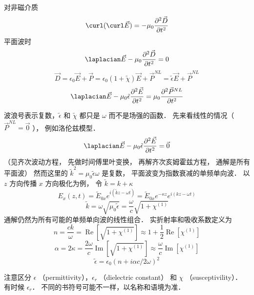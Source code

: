 
对非磁介质
\begin{equation}
  \curl (\curl \vec E) =  - {\mu _0}\frac{{{\partial ^2}\vec D}}{{\partial {t^2}}}
 \end{equation}
平面波时
 \begin{equation}
  {\laplacian}\vec E - {\mu _0}\frac{{{\partial ^2}\vec D}}{{\partial {t^2}}} = 0
 \end{equation}
 \begin{equation}
\vec D = {\epsilon _0}\vec E + \vec P = {\epsilon _0}(1 + \tilde \chi )\vec E + {\vec P^{NL}} = \tilde \epsilon \vec E + {\vec P^{NL}}
 \end{equation}
 \begin{equation}
{\laplacian}\vec E - {\mu _0}\tilde \epsilon \frac{{{\partial ^2}\vec E}}{{\partial {t^2}}} = {\mu _0}\frac{{{\partial ^2}{{\vec P}^{NL}}}}{{\partial {t^2}}}
 \end{equation}
 
波浪号表示复数，$\tilde \epsilon$ 和 $\tilde \chi $ 都只是 $\omega $ 而不是场强的函数． 先来看线性的情况（ ${\vec P^{NL}} = \vec 0$ ）， 例如洛伦兹模型．
\begin{equation}
{\laplacian}\vec E - {\mu _0}\tilde \epsilon \frac{{{\partial ^2}\vec E}}{{\partial {t^2}}} = \vec 0
 \end{equation}
（见齐次波动方程， 先做时间傅里叶变换， 再解齐次亥姆霍兹方程， 通解是所有平面波） 然而这里的 ${\tilde k^2} = {\mu _0}\tilde \epsilon \omega$ 是复数， 平面波变为指数衰减的单频单向波． 以 $z$ 方向传播 $x$ 方向极化为例， 令  $\tilde k = k + \kappa $ 
\begin{equation}
{E_x}(z,t) = {\tilde E_{0x}}{e^{i(\tilde kz - \omega t)}} = {\tilde E_{0x}}{e^{ - \kappa z}}{e^{i(kz - \omega t)}}
\end{equation}
\begin{equation}
\tilde k = \omega \sqrt {{\mu _0}\tilde \epsilon }  = \frac{\omega }{c}\sqrt {1 + {\chi ^{(1)}}}
\end{equation}
通解仍然为所有可能的单频单向波的线性组合． 实折射率和吸收系数定义为
\begin{equation}
n = \frac{{ck}}{\omega } = \operatorname{Re} \left[ {\sqrt {1 + {\chi ^{(1)}}} } \right] \approx 1 + \frac{1}{2}\operatorname{Re} [{\chi ^{(1)}}]
\end{equation}
\begin{equation}
\alpha  = 2\kappa  = \frac{{2\omega }}{c}\operatorname{Im} \left[ {\sqrt {1 + {\chi ^{(1)}}} } \right] \approx \frac{\omega }{c}\operatorname{Im} [{\chi ^{(1)}}]
\end{equation}
\begin{equation}
\tilde \epsilon  = {\epsilon _0}{(n + i\alpha c/2\omega )^2}
\end{equation}
 
注意区分 $\epsilon$ 
（permittivity），${\epsilon _r}$ （dielectric constant） 和 $\chi $ （susceptivility）． 有时候 ${\epsilon _r}$． 不同的书符号可能不一样，以名称和语境为准．

